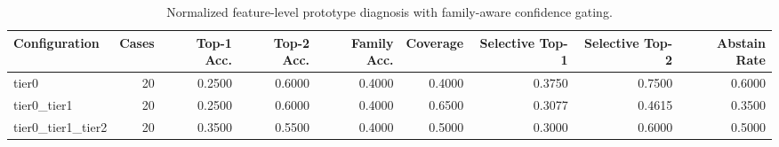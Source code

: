 \begin{table}[t]
\centering
\caption{Normalized feature-level prototype diagnosis with family-aware confidence gating.}
\label{tab:dice_stressor_hierarchical_diagnosis}
\footnotesize
\begin{tabular}{lrrrrrrrr}
\toprule
Configuration & Cases & Top-1 Acc. & Top-2 Acc. & Family Acc. & Coverage & Selective Top-1 & Selective Top-2 & Abstain Rate \\
\midrule
tier0 & 20 & 0.2500 & 0.6000 & 0.4000 & 0.4000 & 0.3750 & 0.7500 & 0.6000 \\
tier0_tier1 & 20 & 0.2500 & 0.6000 & 0.4000 & 0.6500 & 0.3077 & 0.4615 & 0.3500 \\
tier0_tier1_tier2 & 20 & 0.3500 & 0.5500 & 0.4000 & 0.5000 & 0.3000 & 0.6000 & 0.5000 \\
\bottomrule
\end{tabular}

\end{table}
